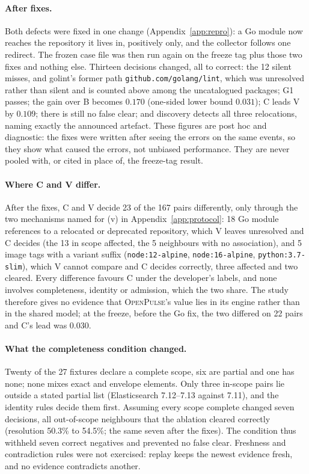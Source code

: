 \documentclass[11pt,a4paper]{article}
\newcommand{\op}{\textsc{OpenPulse}}
\newcommand{\code}[1]{\texttt{#1}}
\begin{document}
\paragraph{After fixes.} Both defects were fixed in one change
(Appendix~\ref{app:repro}): a Go module now reaches the repository it
lives in, positively only, and the collector follows one redirect. The
frozen case file was then run again on the freeze tag plus those two
fixes and nothing else. Thirteen decisions changed, all to correct:
the 12 silent misses, and golint's former path
\code{github.com/golang/lint}, which was unresolved rather than silent
and is counted above among the uncatalogued packages; G1
passes; the gain over B becomes $0.170$ (one-sided lower bound
$0.031$); C leads V by $0.109$; there is still no false clear; and
discovery detects all three relocations, naming exactly the announced
artefact. These figures are post hoc and diagnostic: the fixes were
written after seeing the errors on the same events, so they show what
caused the errors, not unbiased performance. They are never pooled
with, or cited in place of, the freeze-tag result.

\paragraph{Where C and V differ.} After the fixes, C and V decide 23
of the 167 pairs differently, only through the two mechanisms named
for (v) in Appendix~\ref{app:protocol}: 18 Go module references to a
relocated or deprecated repository, which V leaves unresolved and C
decides (the 13 in scope affected, the 5 neighbours with no
association), and 5 image tags with a variant suffix
(\code{node:12-alpine}, \code{node:16-alpine},
\code{python:3.7-slim}), which V cannot compare and C decides
correctly, three affected and two cleared. Every difference favours C
under the developer's labels, and none involves completeness,
identity or admission, which the two share. The study therefore gives
no evidence that \op{}'s value lies in its engine rather than in the
shared model; at the freeze, before the Go fix, the two differed on 22
pairs and C's lead was 0.030.

\paragraph{What the completeness condition changed.} Twenty of the 27
fixtures declare a complete scope, six are partial and one has none;
none mixes exact and envelope elements. Only three in-scope pairs lie
outside a stated partial list (Elasticsearch 7.12--7.13 against 7.11),
and the identity rules decide them first. Assuming every scope
complete changed seven decisions, all out-of-scope neighbours that the
ablation cleared correctly (resolution 50.3\% to 54.5\%; the same seven
after the fixes). The condition thus withheld seven correct negatives
and prevented no false clear. Freshness and contradiction rules were
not exercised: replay keeps the newest evidence fresh, and no evidence
contradicts another.
\end{document}
